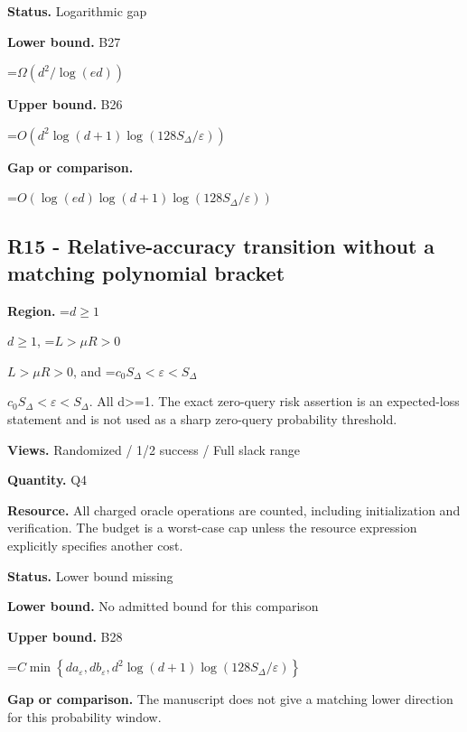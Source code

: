 \documentclass[10pt,a4paper]{article}
\newcommand{\AtlasMath}[1]{\par\begingroup\centering\setbox0=\hbox{$\displaystyle #1$}\ifdim\wd0>1.4\linewidth\typeout{ATLAS WIDE FORMULA: \the\wd0}\fi\ifdim\wd0>\linewidth\resizebox{\linewidth}{!}{\box0}\else\box0\fi\par\endgroup}
\newcommand{\AtlasInlineMath}[1]{\begingroup\setbox0=\hbox{$#1$}\ifdim\wd0>.4\linewidth\endgroup\AtlasMath{#1}\else\endgroup$#1$\fi}
\begin{document}
\textbf{Status.} Logarithmic gap



\textbf{Lower bound.} B27



\AtlasMath{\Omega(d^2/\log(ed))}


\textbf{Upper bound.} B26



\AtlasMath{O\!\left(d^2\log(d+1)\log(128S_\Delta/\varepsilon)\right)}


\textbf{Gap or comparison.}



\AtlasMath{O\!\left(\log(ed)\log(d+1)\log(128S_\Delta/\varepsilon)\right)}


\subsection{R15 - Relative-accuracy transition without a matching polynomial bracket}


\textbf{Region.} \AtlasInlineMath{d\ge1}, \AtlasInlineMath{L>\mu R>0}, and \AtlasInlineMath{c_0S_\Delta<\varepsilon<S_\Delta}. All d>=1. The exact zero-query risk assertion is an expected-loss statement and is not used as a sharp zero-query probability threshold.



\textbf{Views.} Randomized / 1/2 success / Full slack range



\textbf{Quantity.} Q4



\textbf{Resource.} All charged oracle operations are counted, including initialization and verification. The budget is a worst-case cap unless the resource expression explicitly specifies another cost.



\textbf{Status.} Lower bound missing



\textbf{Lower bound.} No admitted bound for this comparison



\textbf{Upper bound.} B28



\AtlasMath{C\min\left\{da_\varepsilon,db_\varepsilon,d^2\log(d+1)\log(128S_\Delta/\varepsilon)\right\}}


\textbf{Gap or comparison.} The manuscript does not give a matching lower direction for this probability window.
\end{document}
